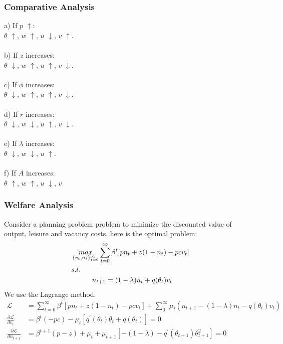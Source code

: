 \documentclass{article}
\begin{document}
\subsubsection{Comparative Analysis}
a) If $p$ $\uparrow$:\\
\indent $\theta$ $\uparrow$, $w$ $\uparrow$, $u$ $\downarrow$, $v$ $\uparrow$.\\\\
b) If $z$ increases:\\
\indent $\theta$ $\downarrow$, $w$ $\uparrow$, $u$ $\uparrow$, $v$ $\downarrow$.\\\\
c) If $\phi$ increases:\\
\indent $\theta$ $\downarrow$, $w$ $\uparrow$, $u$ $\uparrow$, $v$ $\downarrow$.\\\\
d) If $r$ increases:\\
\indent $\theta$ $\downarrow$, $w$ $\downarrow$, $u$ $\uparrow$, $v$ $\downarrow$.\\\\
e) If $\lambda$ increases:\\
\indent $\theta$ $\downarrow$, $w$ $\downarrow$, $u$ $\uparrow$.\\\\
f) If $A$ increases:\\
\indent $\theta$ $\uparrow$, $w$ $\uparrow$, $u$ $\downarrow$, $v$ 


\subsubsection{Welfare Analysis}
Consider a planning problem problem to minimize the discounted value of output, leisure and vacancy costs, here is the optimal problem:
\begin{align*}
	&\mathop{max}\limits_{\{v_t, n_t\}^\infty_{t=0}} \sum\limits^\infty_{t=0} \beta^t [pn_t + z(1 - n_t) - pcv_t]\\
	&s.t.\\
	&\indent\indent n_{t+1} = (1 - \lambda)n_t + q(\theta_t)v_t
\end{align*}
We use the Lagrange method:
\begin{align*}
	\mathscr{L} &= \sum\limits^\infty_{t=0} \beta^t [pn_t + z(1 - n_t) - pcv_t] + \sum\limits^\infty_0 \mu_t (n_{t+1} - (1 - \lambda)n_t - q(\theta_t)v_t)\\
	\frac{\partial \mathscr{L}}{\partial v_t} &= \beta^t(-pc) -\mu_t [q^\prime(\theta_t)\theta_t + q(\theta_t)] = 0\\
	\frac{\partial \mathscr{L}}{\partial n_{t+1}} &= \beta^{t+1} (p -z) + \mu_{t} + \mu_{t+1}[-(1 - \lambda) - q^\prime(\theta_{t+1})\theta^2_{t+1}] =0
\end{align*}
\end{document}
